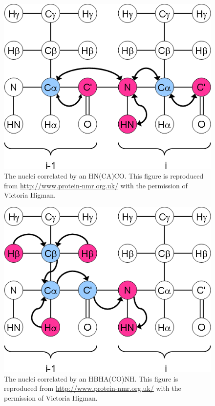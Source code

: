\begin{figure}
  \includegraphics[scale=0.75]{figures/ccpn_hncaco}
  \caption[The nuclei correlated by an HN(CA)CO.]
          {The nuclei correlated by an HN(CA)CO.
           This figure is reproduced from \url{http://www.protein-nmr.org.uk/}
           with the permission of Victoria Higman.}
  \label{ccpn_hncaco}
\end{figure}

\begin{figure}
  \includegraphics[scale=0.75]{figures/ccpn_hbhaconh}
  \caption[The nuclei correlated by an HBHA(CO)NH.]
          {The nuclei correlated by an HBHA(CO)NH.
           This figure is reproduced from \url{http://www.protein-nmr.org.uk/}
           with the permission of Victoria Higman.}
  \label{ccpn_hbhaconh}
\end{figure}

